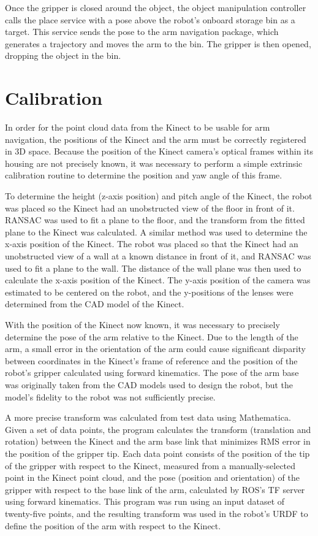 \documentclass[]{cwru} %
\begin{document}
Once the gripper is closed around the object, the object manipulation
controller calls the place service with a pose above the robot's onboard
storage bin as a target. This service sends the pose to the arm
navigation package, which generates a trajectory and moves the arm to
the bin. The gripper is then opened, dropping the object in the bin.

\section{Calibration}

In order for the point cloud data from the Kinect to be usable for arm
navigation, the positions of the Kinect and the arm must be correctly
registered in 3D space. Because the position of the Kinect camera's
optical frames within its housing are not precisely known, it was
necessary to perform a simple extrinsic calibration routine to determine
the position and yaw angle of this frame.

To determine the height (z-axis position) and pitch angle of the Kinect,
the robot was placed so the Kinect had an unobstructed view of the floor
in front of it. RANSAC \cite{fischler} was used to fit a plane to the floor, and
the transform from the fitted plane to the Kinect was calculated. A
similar method was used to determine the x-axis position of the Kinect.
The robot was placed so that the Kinect had an unobstructed view of a
wall at a known distance in front of it, and RANSAC was used to fit a
plane to the wall. The distance of the wall plane was then used to
calculate the x-axis position of the Kinect. The y-axis position of the
camera was estimated to be centered on the robot, and the y-positions of
the lenses were determined from the CAD model of the Kinect.

With the position of the Kinect now known, it was necessary to precisely
determine the pose of the arm relative to the Kinect. Due to the length
of the arm, a small error in the orientation of the arm could cause
significant disparity between coordinates in the Kinect's frame of
reference and the position of the robot's gripper calculated using
forward kinematics. The pose of the arm base was originally taken from
the CAD models used to design the robot, but the model's fidelity to the
robot was not sufficiently precise.

A more precise transform was calculated from test data using
Mathematica. Given a set of data points, the program calculates the
transform (translation and rotation) between the Kinect and the arm base
link that minimizes RMS error in the position of the gripper tip. Each
data point consists of the position of the tip of the gripper with
respect to the Kinect, measured from a manually-selected point in the
Kinect point cloud, and the pose (position and orientation) of the
gripper with respect to the base link of the arm, calculated by ROS's TF
server using forward kinematics. This program was run using an input
dataset of twenty-five points, and the resulting transform was used in
the robot's URDF to define the position of the arm with respect to the
Kinect.
\end{document}

